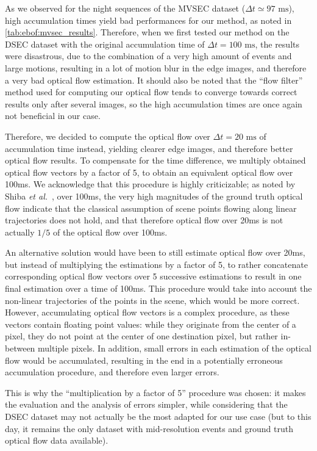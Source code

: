 As we observed for the night sequences of the MVSEC dataset (\(\Delta t \simeq 97\text{ ms}\)), high accumulation times yield bad performances for our method, as noted in \cref{tab:ebof:mvsec_results}. Therefore, when we first tested our method on the DSEC dataset with the original accumulation time of \(\Delta t = 100\text{ ms}\), the results were disastrous, due to the combination of a very high amount of events and large motions, resulting in a lot of motion blur in the edge images, and therefore a very bad optical flow estimation. It should also be noted that the ``flow filter'' method used for computing our optical flow tends to converge towards correct results only after several images, so the high accumulation times are once again not beneficial in our case.

Therefore, we decided to compute the optical flow over \(\Delta t = 20\text{ ms}\) of accumulation time instead, yielding clearer edge images, and therefore better optical flow results. To compensate for the time difference, we multiply obtained optical flow vectors by a factor of 5, to obtain an equivalent optical flow over 100ms. We acknowledge that this procedure is highly criticizable; as noted by Shiba \textit{et al.}~\cite{Shiba2022SecretsOE}, over 100ms, the very high magnitudes of the ground truth optical flow indicate that the classical assumption of scene points flowing along linear trajectories does not hold, and that therefore optical flow over 20ms is not actually \(1/5\) of the optical flow over 100ms.

An alternative solution would have been to still estimate optical flow over 20ms, but instead of multiplying the estimations by a factor of 5, to rather concatenate corresponding optical flow vectors over 5 successive estimations to result in one final estimation over a time of 100ms. This procedure would take into account the non-linear trajectories of the points in the scene, which would be more correct. However, accumulating optical flow vectors is a complex procedure, as these vectors contain floating point values: while they originate from the center of a pixel, they do not point at the center of one destination pixel, but rather in-between multiple pixels. In addition, small errors in each estimation of the optical flow would be accumulated, resulting in the end in a potentially erroneous accumulation procedure, and therefore even larger errors.

This is why the ``multiplication by a factor of 5'' procedure was chosen: it makes the evaluation and the analysis of errors simpler, while considering that the DSEC dataset may not actually be the most adapted for our use case (but to this day, it remains the only dataset with mid-resolution events and ground truth optical flow data available).

